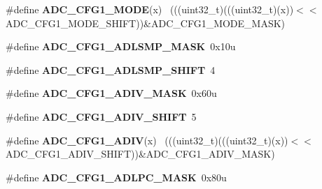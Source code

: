 \begin{DoxyCompactItemize}
\item 
\hypertarget{group___a_d_c___register___masks_gad41333101d9de382b4bc5f0a402073c1}{}\#define {\bfseries A\+D\+C\+\_\+\+C\+F\+G1\+\_\+\+M\+O\+D\+E}(x)                                              ~(((uint32\+\_\+t)(((uint32\+\_\+t)(x))$<$$<$A\+D\+C\+\_\+\+C\+F\+G1\+\_\+\+M\+O\+D\+E\+\_\+\+S\+H\+I\+F\+T))\&A\+D\+C\+\_\+\+C\+F\+G1\+\_\+\+M\+O\+D\+E\+\_\+\+M\+A\+S\+K)\label{group___a_d_c___register___masks_gad41333101d9de382b4bc5f0a402073c1}

\item 
\hypertarget{group___a_d_c___register___masks_ga3f96490246c5bef5f9ccede781423b22}{}\#define {\bfseries A\+D\+C\+\_\+\+C\+F\+G1\+\_\+\+A\+D\+L\+S\+M\+P\+\_\+\+M\+A\+S\+K}~0x10u\label{group___a_d_c___register___masks_ga3f96490246c5bef5f9ccede781423b22}

\item 
\hypertarget{group___a_d_c___register___masks_gab2cd2b0ee8a3e6c0e3710e5477ba4f25}{}\#define {\bfseries A\+D\+C\+\_\+\+C\+F\+G1\+\_\+\+A\+D\+L\+S\+M\+P\+\_\+\+S\+H\+I\+F\+T}~4\label{group___a_d_c___register___masks_gab2cd2b0ee8a3e6c0e3710e5477ba4f25}

\item 
\hypertarget{group___a_d_c___register___masks_gaffbe8246d864b7889a3ce04b94e6d948}{}\#define {\bfseries A\+D\+C\+\_\+\+C\+F\+G1\+\_\+\+A\+D\+I\+V\+\_\+\+M\+A\+S\+K}~0x60u\label{group___a_d_c___register___masks_gaffbe8246d864b7889a3ce04b94e6d948}

\item 
\hypertarget{group___a_d_c___register___masks_gacbe42773bc1f15c2870c2422c89bfe67}{}\#define {\bfseries A\+D\+C\+\_\+\+C\+F\+G1\+\_\+\+A\+D\+I\+V\+\_\+\+S\+H\+I\+F\+T}~5\label{group___a_d_c___register___masks_gacbe42773bc1f15c2870c2422c89bfe67}

\item 
\hypertarget{group___a_d_c___register___masks_gaa362fe571350f53f76404664a1643079}{}\#define {\bfseries A\+D\+C\+\_\+\+C\+F\+G1\+\_\+\+A\+D\+I\+V}(x)                                              ~(((uint32\+\_\+t)(((uint32\+\_\+t)(x))$<$$<$A\+D\+C\+\_\+\+C\+F\+G1\+\_\+\+A\+D\+I\+V\+\_\+\+S\+H\+I\+F\+T))\&A\+D\+C\+\_\+\+C\+F\+G1\+\_\+\+A\+D\+I\+V\+\_\+\+M\+A\+S\+K)\label{group___a_d_c___register___masks_gaa362fe571350f53f76404664a1643079}

\item 
\hypertarget{group___a_d_c___register___masks_ga308bdf4f339315924bd36b1f2aa3d254}{}\#define {\bfseries A\+D\+C\+\_\+\+C\+F\+G1\+\_\+\+A\+D\+L\+P\+C\+\_\+\+M\+A\+S\+K}~0x80u\label{group___a_d_c___register___masks_ga308bdf4f339315924bd36b1f2aa3d254}


\end{DoxyCompactItemize}

